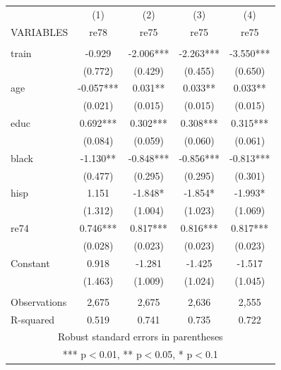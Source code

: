 \documentclass[]{article}
\begin{document}
\begin{tabular}{lcccc} \hline
 & (1) & (2) & (3) & (4) \\
VARIABLES & re78 & re75 & re75 & re75 \\ \hline
 &  &  &  &  \\
train & -0.929 & -2.006*** & -2.263*** & -3.550*** \\
 & (0.772) & (0.429) & (0.455) & (0.650) \\
age & -0.057*** & 0.031** & 0.033** & 0.033** \\
 & (0.021) & (0.015) & (0.015) & (0.015) \\
educ & 0.692*** & 0.302*** & 0.308*** & 0.315*** \\
 & (0.084) & (0.059) & (0.060) & (0.061) \\
black & -1.130** & -0.848*** & -0.856*** & -0.813*** \\
 & (0.477) & (0.295) & (0.295) & (0.301) \\
hisp & 1.151 & -1.848* & -1.854* & -1.993* \\
 & (1.312) & (1.004) & (1.023) & (1.069) \\
re74 & 0.746*** & 0.817*** & 0.816*** & 0.817*** \\
 & (0.028) & (0.023) & (0.023) & (0.023) \\
Constant & 0.918 & -1.281 & -1.425 & -1.517 \\
 & (1.463) & (1.009) & (1.024) & (1.045) \\
 &  &  &  &  \\
Observations & 2,675 & 2,675 & 2,636 & 2,555 \\
 R-squared & 0.519 & 0.741 & 0.735 & 0.722 \\ \hline
\multicolumn{5}{c}{ Robust standard errors in parentheses} \\
\multicolumn{5}{c}{ *** p$<$0.01, ** p$<$0.05, * p$<$0.1} \\
\end{tabular}
\end{document}
